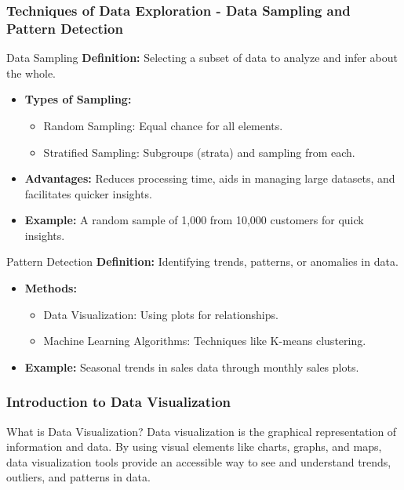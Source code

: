 \documentclass[aspectratio=169]{beamer}
\begin{document}
\begin{frame}[fragile]
    \frametitle{Techniques of Data Exploration - Data Sampling and Pattern Detection}
    \begin{block}{Data Sampling}
        \textbf{Definition:} Selecting a subset of data to analyze and infer about the whole.
    \end{block}
    \begin{itemize}
        \item \textbf{Types of Sampling:}
        \begin{itemize}
            \item Random Sampling: Equal chance for all elements.
            \item Stratified Sampling: Subgroups (strata) and sampling from each.
        \end{itemize}
        \item \textbf{Advantages:} Reduces processing time, aids in managing large datasets, and facilitates quicker insights.
        \item \textbf{Example:} A random sample of 1,000 from 10,000 customers for quick insights.
    \end{itemize}

    \begin{block}{Pattern Detection}
        \textbf{Definition:} Identifying trends, patterns, or anomalies in data.
    \end{block}
    \begin{itemize}
        \item \textbf{Methods:}
        \begin{itemize}
            \item Data Visualization: Using plots for relationships.
            \item Machine Learning Algorithms: Techniques like K-means clustering.
        \end{itemize}
        \item \textbf{Example:} Seasonal trends in sales data through monthly sales plots.
    \end{itemize}
\end{frame}

\begin{frame}[fragile]
    \frametitle{Introduction to Data Visualization}
    \begin{block}{What is Data Visualization?}
        Data visualization is the graphical representation of information and data. By using visual elements like charts, graphs, and maps, data visualization tools provide an accessible way to see and understand trends, outliers, and patterns in data.
    \end{block}
\end{frame}
\end{document}
